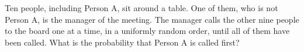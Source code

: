 Ten people, including Person A, sit around a table. One of them, who is not Person A, is the manager of the meeting. The manager calls the other nine people to the board one at a time, in a uniformly random order, until all of them have been called. What is the probability that Person A is called first?
